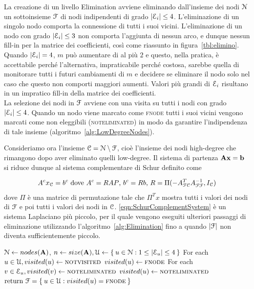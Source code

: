 La creazione di un livello Elimination avviene eliminando dall'insieme dei nodi $\mathcal{N}$ un sottoinsieme $\mathcal{F}$ di nodi indipendenti di grado $|\mathcal{E}_i| \leq 4$.
L'eliminazione di un singolo nodo comporta la connessione di tutti i suoi vicini. 
L'eliminazione di un nodo con grado $|\mathcal{E}_i| \leq 3$ non comporta l'aggiunta di nessun arco, e dunque nessun fill-in per la matrice dei coefficienti, così come riassunto in figura~\vref{tbl:elimino}.
Quando $|\mathcal{E}_i| = 4$, $m$ può aumentare di al più $2$ e questo, nella pratica, è accettabile perché l'alternativa, impraticabile perché costosa, sarebbe quella di monitorare tutti i futuri cambiamenti di $m$ e decidere se eliminare il nodo solo nel caso che questo non comporti maggiori aumenti.
Valori più grandi di $\mathcal{E}_i$ risultano in un impratico fill-in della matrice dei coefficienti.
\\
La selezione dei nodi in $\mathcal{F}$ avviene con una visita su tutti i nodi con grado $|\mathcal{E}_i| \leq 4$. Quando un nodo viene marcato come \textsc{fnode} tutti i suoi vicini vengono marcati come non eleggibili (\textsc{noteliminated}) in modo da garantire l'indipendenza di tale insieme (algoritmo~\vref{alg:LowDegreeNodes}).

Consideriamo ora l'insieme $\mathcal{C} = \mathcal{N} \setminus \mathcal{F}$, cioè l'insieme dei nodi high-degree che rimangono dopo aver eliminato quelli low-degree. Il sistema di partenza $\mathbf{Ax} = \mathbf{b}$ si riduce dunque al sistema complementare di Schur definito come

\begin{equation}
\label{eqn:SchurComplementSystem}
A^cx_{\C} = b^c \text{ dove }%
A^c = RAP \text{, }%
b^c = Rb \text{, }%
R  = \Pi (-A_{\F\C}^T A_{\F\F}^{-1},I_{\C})
\end{equation}
dove $\Pi$ è una matrice di permutazione tale che $\Pi^Tx$ mostra tutti i valori dei nodi di $\mathcal{F}$ e poi tutti i valori dei nodi in $\mathcal{C}$.
\eqref{eqn:SchurComplementSystem} è un sistema Laplaciano più piccolo, per il quale vengono eseguiti ulteriori passaggi di eliminazione utilizzando l'algoritmo~\vref{alg:Elimination} fino a quando $\lvert\mathcal{F}\rvert$ non diventa sufficientemente piccolo.

\begin{algorithm}
\caption{$\F = LowDegreeNodes(\matr{A})$}\label{alg:LowDegreeNodes}
\begin{algorithmic}[1]
\State $\mathcal{N}\gets nodes(\mathbf{A})$, $n \gets size(\mathbf{A}), \mathcal{U} \gets \Set{u\in\mathcal{N}: 1 \le \lvert\mathcal{E}_u\rvert \le 4}$
\State For each $u \in \mathcal{U}, visited(u) \gets \text{\textsc{notvisited}}$
			\State $visited(u) \gets \text{\textsc{fnode}}$
			\State For each $v \in \mathcal{E}_u, visited(v) \gets \text{\textsc{noteliminated}}$
		\Else{}
			\State $visited(u)\gets\text{\textsc{noteliminated}}$
		\EndIf
	\EndIf
\EndFor
\State $\text{return } \mathcal{F} = \Set{u \in \mathcal{U}: visited(u) = \text{\textsc{fnode}}}$
\end{algorithmic}
\end{algorithm}

